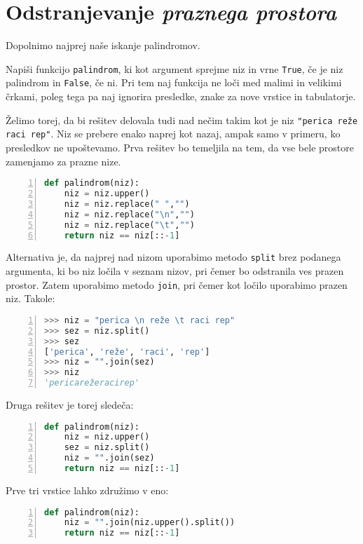 \section{Odstranjevanje \emph{praznega prostora}}

Dopolnimo najprej naše iskanje palindromov.
\begin{zgled}
Napiši funkcijo \texttt{palindrom}, ki kot argument sprejme niz in vrne \texttt{True}, če je niz palindrom in \texttt{False}, če ni. Pri tem naj funkcija ne loči med malimi in velikimi črkami, poleg tega pa naj ignorira presledke, znake za nove vrstice in tabulatorje.
\end{zgled}

\begin{resitev}
Želimo torej, da bi rešitev delovala tudi nad nečim takim kot je niz \texttt{"perica reže raci rep"}. Niz se prebere enako naprej kot nazaj, ampak samo v primeru, ko presledkov ne upoštevamo. Prva rešitev bo temeljila na tem, da vse bele prostore zamenjamo za prazne nize.
\begin{lstlisting}[language=Python, showstringspaces=false,numbers=left]
def palindrom(niz):
    niz = niz.upper()
    niz = niz.replace(" ","")
    niz = niz.replace("\n","")
    niz = niz.replace("\t","")
    return niz == niz[::-1]
\end{lstlisting}
Alternativa je, da najprej nad nizom uporabimo metodo \texttt{split} brez podanega argumenta, ki bo niz ločila v seznam nizov, pri čemer bo odstranila ves prazen prostor. Zatem uporabimo metodo \texttt{join}, pri čemer kot ločilo uporabimo prazen niz. Takole:
\begin{lstlisting}[language=Python, showstringspaces=false,numbers=left]
>>> niz = "perica \n reže \t raci rep"
>>> sez = niz.split()
>>> sez
['perica', 'reže', 'raci', 'rep']
>>> niz = "".join(sez)
>>> niz
'pericarežeracirep'
\end{lstlisting}
Druga rešitev je torej sledeča:
\begin{lstlisting}[language=Python, showstringspaces=false,numbers=left]
def palindrom(niz):
    niz = niz.upper()
    sez = niz.split()
    niz = "".join(sez)
    return niz == niz[::-1]
\end{lstlisting}
Prve tri vrstice lahko združimo v eno:
\begin{lstlisting}[language=Python, showstringspaces=false,numbers=left]
def palindrom(niz):
    niz = "".join(niz.upper().split())
    return niz == niz[::-1]
\end{lstlisting}
\end{resitev}

